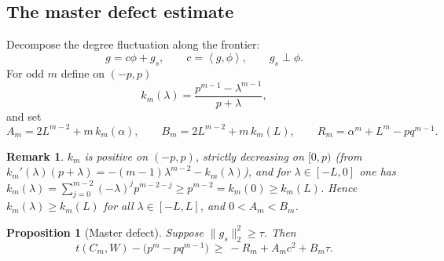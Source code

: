 \documentclass[11pt]{article}
\newtheorem{proposition}[theorem]{Proposition}
\newtheorem{remark}[theorem]{Remark}
\newcommand{\ip}[2]{\left\langle #1,#2\right\rangle}
\begin{document}
\subsection{The master defect estimate}

Decompose the degree fluctuation along the frontier:
\begin{equation}\label{eq:g-decomp}
        g=c\phi+g_s,\qquad c=\ip g\phi,\qquad g_s\perp\phi .
\end{equation}
For odd $m$ define on $(-p,p)$
\begin{equation}\label{eq:kdef}
        k_m(\lambda)=\frac{p^{m-1}-\lambda^{m-1}}{p+\lambda},
\end{equation}
and set
\begin{equation}\label{eq:AB-def}
        A_m=2L^{m-2}+m\,k_m(\alpha),
        \qquad
        B_m=2L^{m-2}+m\,k_m(L),
        \qquad
        R_m=\alpha^m+L^m-pq^{m-1}.
\end{equation}

\begin{remark}\label{rmk:knegative}
$k_m$ is positive on $(-p,p)$, strictly decreasing on $[0,p)$ (from
$k_m'(\lambda)(p+\lambda)=-(m-1)\lambda^{m-2}-k_m(\lambda)$), and for
$\lambda\in[-L,0]$ one has
$k_m(\lambda)=\sum_{j=0}^{m-2}(-\lambda)^jp^{m-2-j}\ge p^{m-2}=k_m(0)\ge k_m(L)$.
Hence $k_m(\lambda)\ge k_m(L)$ for \emph{all} $\lambda\in[-L,L]$, and
$0<A_m<B_m$.
\end{remark}

\begin{proposition}[Master defect]\label{prop:master-defect}
Suppose $\|g_s\|_2^2\ge\tau$.  Then
\begin{equation}\label{eq:master-defect}
        t(C_m,W)-\bigl(p^m-pq^{m-1}\bigr)\ \ge\ -R_m+A_mc^2+B_m\tau .
\end{equation}
\end{proposition}
\end{document}
